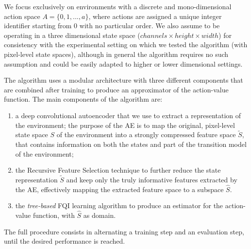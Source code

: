 We focus exclusively on environments with a discrete and mono-dimensional 
action space $A = \{0, 1, ..., a\}$, where actions are assigned a unique integer 
identifier starting from $0$ with no particular order. 
We also assume to be operating in a three dimensional state space 
($channels \times height \times width$) for consistency with the experimental 
setting on which we tested the algorithm (with pixel-level state spaces), 
although in general the algorithm requires no such assumption and could be 
easily adapted to higher or lower dimensional settings. 

The algorithm uses a modular architecture with three different components that 
are combined after training to produce an approximator of the action-value 
function. The main components of the algorithm are:
%
\begin{enumerate}
    \item a deep convolutional autoencoder that we use to extract a 
    representation of the environment;
    the purpose of the AE is to map the original, pixel-level state space $S$ of
    the environment into a strongly compressed feature space ${\tilde{S}}$, 
    that contains information on both the states and part of the transition 
    model of the environment;
    \item the Recursive Feature Selection technique to further 
    reduce the state representation $\tilde{S}$ and keep only the truly 
    informative features extracted by the AE, effectively mapping the extracted 
    feature space to a subspace $\hat{S}$.
    \item the \textit{tree-based} FQI learning algorithm to produce an 
    estimator for the action-value function, with $\hat{S}$ as domain. 
\end{enumerate}
%
The full procedure consists in alternating a training step and an evaluation 
step, until the desired performance is reached.
%
